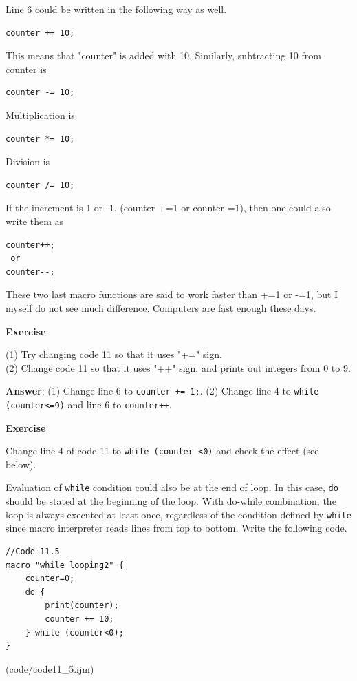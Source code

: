 \documentclass[11pt,a4paper,oneside]{report}
\newenvironment{indentexercise}[1]
{{\setlength{\leftmargin}{2em}}
\textbf{Exercise \thesubsection-#1}
\begin{list}{}
	\item
}
{\end{list}}
\newcommand{\ilcom}[1]{\texttt{\small#1}}
\begin{document}
Line 6 could be written in the following way as well.
\begin{lstlisting}[numbers=none]
counter += 10;
\end{lstlisting}
This means that "counter" is added with 10. Similarly, subtracting 10 from counter is 
\begin{lstlisting}[numbers=none]
counter -= 10;
\end{lstlisting}
Multiplication is 
\begin{lstlisting}[numbers=none]
counter *= 10;
\end{lstlisting}
Division is
\begin{lstlisting}[numbers=none]
counter /= 10;
\end{lstlisting}
If the increment is 1 or -1, (counter +=1 or counter-=1), then one could also write them  as 
\begin{lstlisting}[numbers=none]
counter++;
 or 
counter--;
\end{lstlisting}
These two last macro functions are said to work faster than +=1 or -=1, but I myself do not see much difference. Computers are fast enough these days. 

\begin{indentexercise}{1}
(1) Try changing code 11 so that it uses "+=" sign.\\
(2) Change code 11 so that it uses "++" sign, and prints out integers from 0 to 9.\\

\item \textbf{Answer}: (1) Change line 6 to \ilcom{counter += 1;}. (2) Change line 4 to \ilcom{while (counter<=9)} and line 6 to \ilcom{counter++}.
\end{indentexercise}

\begin{indentexercise}{2}
Change line 4 of code 11 to \ilcom{while (counter <0)} and check the effect (see below).
\end{indentexercise}

Evaluation of \ilcom{while} condition could also be at the end of loop. In this case, \ilcom{do} should be stated at the beginning of the loop. With do-while combination, the loop is always executed at least once, regardless of the condition defined by \ilcom{while} since macro interpreter reads lines from top to bottom. Write the following code.


\begin{lstlisting}[morekeywords={*, while}]
//Code 11.5
macro "while looping2" {
	counter=0;
	do {
		print(counter);
		counter += 10;
	} while (counter<0); 
}
\end{lstlisting}
(code/code11_5.ijm)
\end{document}
